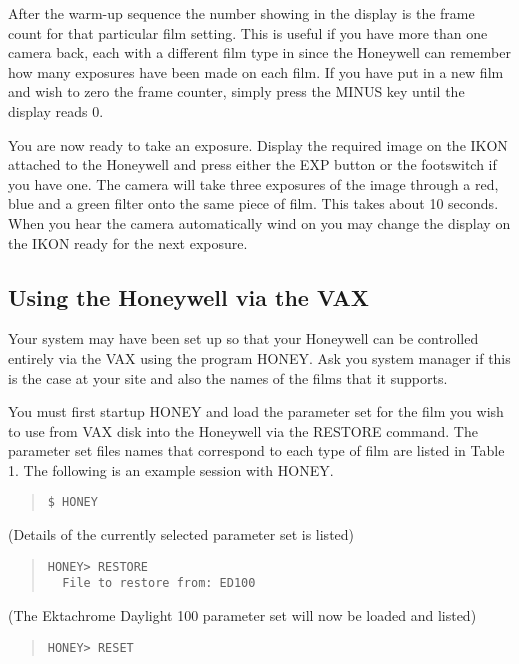 After the warm-up sequence the number showing in the display is the frame count
for that particular film setting. This is useful if you have more than one
camera back, each  with a different film type in since the Honeywell can
remember how many exposures have been made on each film. If you have put in a
new film and wish to zero the frame counter, simply press the MINUS key until
the display reads 0.

You are now ready to take an exposure. Display the required image on the
IKON  attached to the Honeywell and press either the EXP button or the
footswitch if you have one. The camera will take three exposures of the image
through a red, blue and a green filter onto the same piece of film. This takes
about 10 seconds. When you hear the camera automatically wind on you may
change the display on the IKON ready for the next exposure.

\subsection{Using the Honeywell via the VAX}

Your system may have been set up so that your Honeywell can be controlled
entirely via the VAX using the program HONEY. Ask you system manager if this
is the case at your site and also the names of the films that it supports.

You must first startup HONEY and load the parameter set for the film
you wish to use from VAX disk into the Honeywell via the RESTORE command. The
parameter set files names that correspond to each type of film are listed in
Table 1. The following is an example session with HONEY.

\begin{quote}
\begin{verbatim}
$ HONEY
\end{verbatim}
\end{quote}
(Details of the currently selected parameter set is listed)

\begin{quote}
\begin{verbatim}
HONEY> RESTORE
  File to restore from: ED100
\end{verbatim}
\end{quote}

(The Ektachrome Daylight 100 parameter set will now be loaded and listed)

\begin{quote}
\begin{verbatim}
HONEY> RESET
\end{verbatim}
\end{quote}

